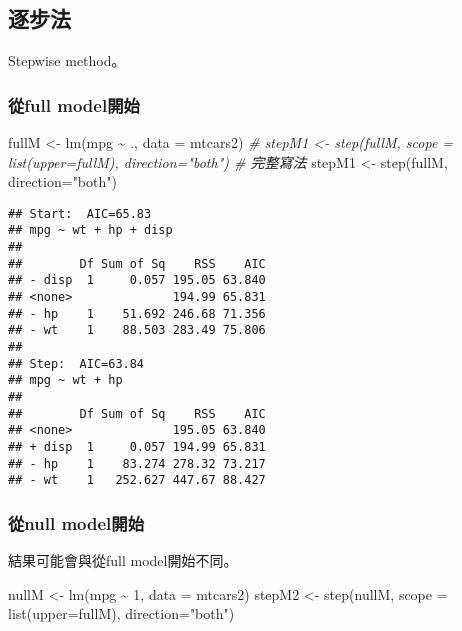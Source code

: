 \documentclass[
]{book}
\newenvironment{Shaded}{\begin{snugshade}}{\end{snugshade}}
\newcommand{\AttributeTok}[1]{\textcolor[rgb]{0.77,0.63,0.00}{#1}}
\newcommand{\CommentTok}[1]{\textcolor[rgb]{0.56,0.35,0.01}{\textit{#1}}}
\newcommand{\DecValTok}[1]{\textcolor[rgb]{0.00,0.00,0.81}{#1}}
\newcommand{\FunctionTok}[1]{\textcolor[rgb]{0.00,0.00,0.00}{#1}}
\newcommand{\NormalTok}[1]{#1}
\newcommand{\OtherTok}[1]{\textcolor[rgb]{0.56,0.35,0.01}{#1}}
\newcommand{\SpecialCharTok}[1]{\textcolor[rgb]{0.00,0.00,0.00}{#1}}
\newcommand{\StringTok}[1]{\textcolor[rgb]{0.31,0.60,0.02}{#1}}
\begin{document}
\hypertarget{ux9010ux6b65ux6cd5}{%
\subsection{逐步法}\label{ux9010ux6b65ux6cd5}}

Stepwise method。

\hypertarget{ux5f9efull-modelux958bux59cb}{%
\subsubsection{從full model開始}\label{ux5f9efull-modelux958bux59cb}}

\begin{Shaded}
\begin{Highlighting}[]
\NormalTok{fullM }\OtherTok{\textless{}{-}} \FunctionTok{lm}\NormalTok{(mpg }\SpecialCharTok{\textasciitilde{}}\NormalTok{ ., }\AttributeTok{data =}\NormalTok{ mtcars2)}
\CommentTok{\# stepM1 \textless{}{-} step(fullM, scope = list(upper=fullM), direction="both") \# 完整寫法}
\NormalTok{stepM1 }\OtherTok{\textless{}{-}} \FunctionTok{step}\NormalTok{(fullM, }\AttributeTok{direction=}\StringTok{"both"}\NormalTok{) }
\end{Highlighting}
\end{Shaded}

\begin{verbatim}
## Start:  AIC=65.83
## mpg ~ wt + hp + disp
## 
##        Df Sum of Sq    RSS    AIC
## - disp  1     0.057 195.05 63.840
## <none>              194.99 65.831
## - hp    1    51.692 246.68 71.356
## - wt    1    88.503 283.49 75.806
## 
## Step:  AIC=63.84
## mpg ~ wt + hp
## 
##        Df Sum of Sq    RSS    AIC
## <none>              195.05 63.840
## + disp  1     0.057 194.99 65.831
## - hp    1    83.274 278.32 73.217
## - wt    1   252.627 447.67 88.427
\end{verbatim}

\hypertarget{ux5f9enull-modelux958bux59cb}{%
\subsubsection{從null model開始}\label{ux5f9enull-modelux958bux59cb}}

結果可能會與從full model開始不同。

\begin{Shaded}
\begin{Highlighting}[]
\NormalTok{nullM }\OtherTok{\textless{}{-}} \FunctionTok{lm}\NormalTok{(mpg }\SpecialCharTok{\textasciitilde{}} \DecValTok{1}\NormalTok{, }\AttributeTok{data =}\NormalTok{ mtcars2)}
\NormalTok{stepM2 }\OtherTok{\textless{}{-}} \FunctionTok{step}\NormalTok{(nullM, }\AttributeTok{scope =} \FunctionTok{list}\NormalTok{(}\AttributeTok{upper=}\NormalTok{fullM), }\AttributeTok{direction=}\StringTok{"both"}\NormalTok{)}
\end{Highlighting}
\end{Shaded}
\end{document}
